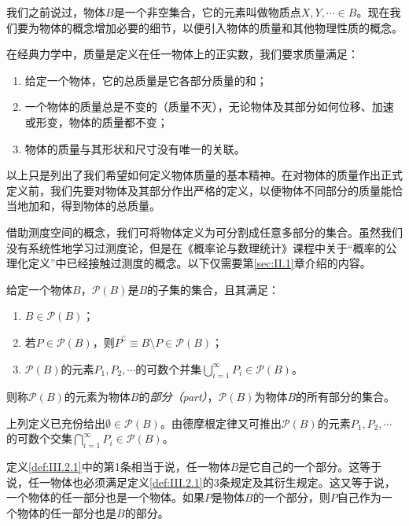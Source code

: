 \documentclass[../main.tex]{subfiles}
\begin{document}
我们之前说过，物体$B$是一个非空集合，它的元素叫做物质点$X,Y,\cdots\in B$。现在我们要为物体的概念增加必要的细节，以便引入物体的质量和其他物理性质的概念。

在经典力学中，质量是定义在任一物体上的正实数，我们要求质量满足：
\begin{enumerate}
    \item 给定一个物体，它的总质量是它各部分质量的和；
    \item 一个物体的质量总是不变的（质量不灭），无论物体及其部分如何位移、加速或形变，物体的质量都不变；
    \item 物体的质量与其形状和尺寸没有唯一的关联。
\end{enumerate}

以上只是列出了我们希望如何定义物体质量的基本精神。在对物体的质量作出正式定义前，我们先要对物体及其部分作出严格的定义，以便物体不同部分的质量能恰当地加和，得到物体的总质量。

借助测度空间的概念，我们可将物体定义为可分割成任意多部分的集合。虽然我们没有系统性地学习过测度论，但是在《概率论与数理统计》\cite{何春雄2012}课程中关于“概率的公理化定义”中已经接触过测度的概念。以下仅需要第\ref{sec:II.1}章介绍的内容。

\begin{definition}[物体的部分]\label{def:III.2.1}
    给定一个物体$B$，$\mathcal{P}\left(B\right)$是$B$的子集的集合，且其满足：
    \begin{enumerate}
        \item $B\in\mathcal{P}\left(B\right)$；
        \item 若$P\in\mathcal{P}\left(B\right)$，则$P^\complement\equiv B\setminus P\in\mathcal{P}\left(B\right)$；
        \item $\mathcal{P}\left(B\right)$的元素$P_1,P_2,\cdots$的可数个并集$\bigcup_{i=1}^\infty P_i\in\mathcal{P}\left(B\right)$。
    \end{enumerate}
    则称$\mathcal{P}\left(B\right)$的元素为物体$B$的\emph{部分（part）}，$\mathcal{P}\left(B\right)$为物体$B$的所有部分的集合。
\end{definition}

上列定义已充份给出$\emptyset\in\mathcal{P}\left(B\right)$。由德摩根定律又可推出$\mathcal{P}\left(B\right)$的元素$P_1,P_2,\cdots$的可数个交集$\bigcap_{i=1}^\infty P_i\in\mathcal{P}\left(B\right)$。

定义\ref{def:III.2.1}中的第1条相当于说，任一物体$B$是它自己的一个部分。这等于说，任一物体也必须满足定义\ref{def:III.2.1}的3条规定及其衍生规定。这又等于说，一个物体的任一部分也是一个物体。如果$P$是物体$B$的一个部分，则$P$自己作为一个物体的任一部分也是$B$的部分。
\end{document}
